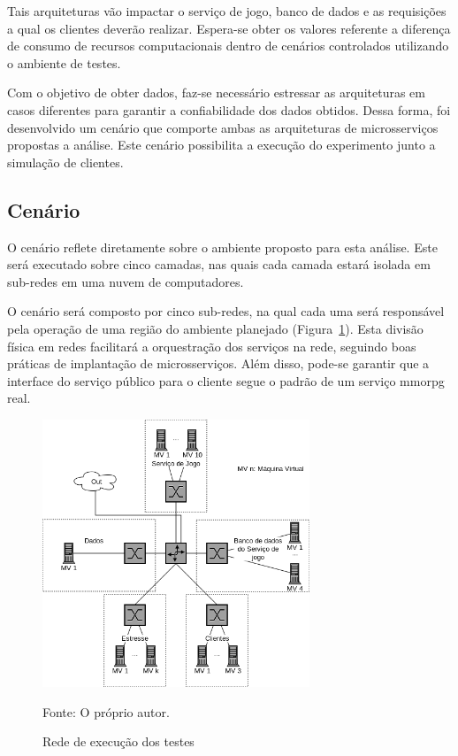 Tais arquiteturas vão impactar o serviço de jogo, banco de dados e as requisições a qual os clientes deverão realizar.
%
Espera-se obter os valores referente a diferença de consumo de recursos computacionais dentro de cenários controlados utilizando o ambiente de testes.



Com o objetivo de obter dados, faz-se necessário estressar as arquiteturas em casos diferentes para garantir a confiabilidade dos dados obtidos.
%
Dessa forma, foi desenvolvido um cenário que comporte ambas as arquiteturas de microsserviços propostas a análise.
%
Este cenário possibilita a execução do experimento junto a simulação de clientes.



\subsection{Cenário}



O cenário reflete diretamente sobre o ambiente proposto para esta análise.
%
Este será executado sobre cinco camadas, nas quais cada camada estará isolada em sub-redes em uma nuvem de computadores.

O cenário será composto por cinco sub-redes, na qual cada uma será responsável pela operação de uma região do ambiente planejado (Figura~\ref{fig:cenario}).
%
Esta divisão física em redes facilitará a orquestração dos serviços na rede, seguindo boas práticas de implantação de microsserviços.
%
Além disso, pode-se garantir que a interface do serviço público para o cliente segue o padrão de um serviço \ac{mmorpg} real.

\begin{figure}[htb!]
  \caption{Rede de execução dos testes}
  \label{fig:cenario}
  \includegraphics[height=8cm]{img/cap3/cenario.png}
  \centering

  Fonte: O próprio autor.
\end{figure}

